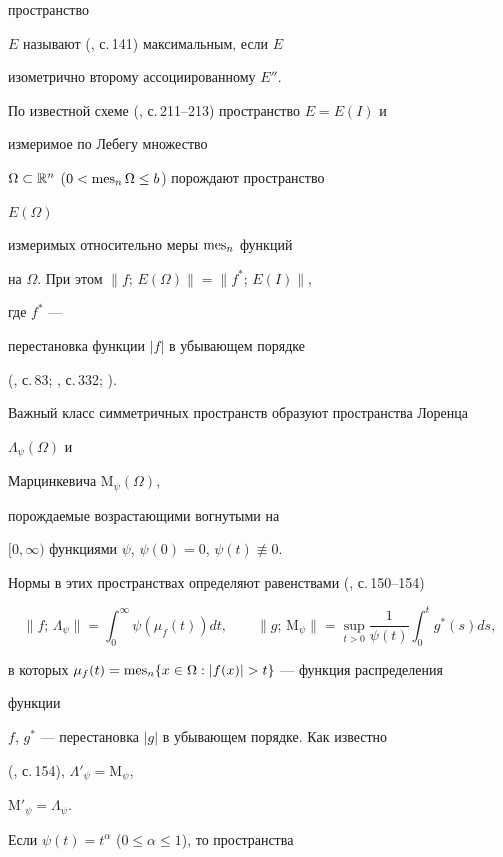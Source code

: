пространство 


$E$ называют (\cite{Kre}, с.\,141) максимальным, если $E$ 


изометрично второму ассоциированному $E''$. 


 


По известной схеме (\cite{Kre}, с.\,211--213) пространство $E=E(I)$ и 


измеримое по Лебегу множество 


$\Omega\subset\Bbb R^n$ ($0<\operatorname{mes}_n\Omega\le b$) порождают пространство 


$E(\Omega)$ 


измеримых относительно меры $\operatorname{mes}_n$ функций 


на $\Omega$. При этом $\|f;\,E(\Omega)\|=\|f^*;\,E(I)\|$, 


где $f^*$ --- 


перестановка функции $|f|$ в убывающем порядке 


(\cite{Kre}, с.\,83; \cite{Har}, с.\,332; \cite{Kol}). 


 


Важный класс симметричных пространств образуют пространства Лоренца 


$\Lambda_\psi(\Omega)$ и 


Марцинкевича $\mathrm M_\psi(\Omega)$, 


порождаемые возрастающими вогнутыми на 


$[0,\infty)$ функциями $\psi$, $\psi(0)=0$, $\psi(t)\not\equiv 0$.


Нормы в этих пространствах определяют равенствами (\cite{Kre}, с.\,150--154) 


$$ 


\|f;\,\Lambda_\psi\|=\int_0^\infty\psi(\mu_f(t))dt, \qquad 


\|g;\,\mathrm M_\psi\|=\sup_{t>0}\frac{1}{\psi(t)} 


\int_0^t g^*(s)ds, 


$$ 


в которых $\mu_f(t)=\mes_n\{x\in\Omega:|f(x)|>t\}$ --- функция распределения 


функции 


$f$, $g^*$ --- перестановка $|g|$ в убывающем порядке. Как известно 


(\cite{Kre}, с.\,154), $\Lambda'_\psi=\mathrm M_\psi$, 


$\mathrm M'_\psi=\Lambda_\psi$. 


Если $\psi(t)=t^\alpha$ ($0\le\alpha\le 1$), то пространства 


